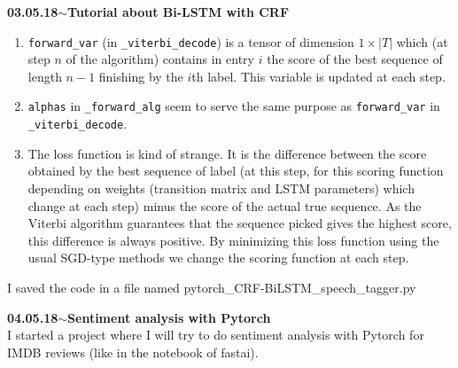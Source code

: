 \documentclass[11pt,a4paper]{article}
\newenvironment{loggentry}[2]%
{\noindent\textbf{#1}\hspace{1cm}$\mathbf{\sim}$\text{ }\textbf{#2}\\}{\vspace{0.5cm}}
\begin{document}
\begin{loggentry}{03.05.18}{Tutorial about Bi-LSTM with CRF}
\begin{enumerate}
\item \texttt{forward\_var} (in \texttt{\_viterbi\_decode}) is a tensor of dimension $1\times |T|$ which (at step $n$ of the algorithm) contains in entry $i$ the score of the best sequence of length $n-1$ finishing by the $i$th label. This variable is updated at each step.
\item \texttt{alphas} in \texttt{\_forward\_alg} seem to serve the same purpose as \texttt{forward\_var} in \texttt{\_viterbi\_decode}.
\item The loss function is kind of strange. It is the difference between the score obtained by the best sequence of label (at this step, for this scoring function depending on weights (transition matrix and LSTM parameters) which change at each step) minus the score of the actual true sequence. As the Viterbi algorithm guarantees that the sequence picked gives the highest score, this difference is always positive. By minimizing this loss function using the usual SGD-type methods we change the scoring function at each step.
\end{enumerate}
I saved the code in a file named pytorch\_CRF-BiLSTM\_speech\_tagger.py
\end{loggentry}

\begin{loggentry}{04.05.18}{Sentiment analysis with Pytorch}
I started a project where I will try to do sentiment analysis with Pytorch for IMDB reviews (like in the notebook of fastai).
\end{loggentry}
\end{document}
